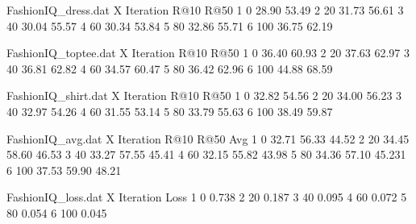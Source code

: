 \documentclass[10pt,lineno]{wlpeerj}
\begin{document}
\begin{filecontents}{FashionIQ_dress.dat}
X Iteration     R@10        R@50                
1 0	            28.90       53.49                 
2 20            31.73       56.61               	
3 40		    30.04       55.57     
4 60            30.34       53.84     	    
5 80            32.86       55.71     	    
6 100           36.75       62.19     	    
\end{filecontents}
\begin{filecontents}{FashionIQ_toptee.dat}
X Iteration     R@10        R@50                
1 0	            36.40       60.93                 
2 20            37.63       62.97               	
3 40		    36.81       62.82     
4 60            34.57       60.47     	    
5 80            36.42       62.96     	    
6 100           44.88       68.59     	    
\end{filecontents}
\begin{filecontents}{FashionIQ_shirt.dat}
X Iteration     R@10        R@50                
1 0	            32.82       54.56                 
2 20            34.00       56.23               	
3 40		    32.97       54.26     
4 60            31.55       53.14     	    
5 80            33.79       55.63     	    
6 100           38.49       59.87     	    
\end{filecontents}
\begin{filecontents}{FashionIQ_avg.dat}
X Iteration     R@10    R@50    Avg                     
1 0	            32.71   56.33   44.52                       
2 20            34.45   58.60   46.53                   	
3 40		    33.27   57.55   45.41        
4 60            32.15   55.82   43.98        	    
5 80            34.36   57.10   45.231        	    
6 100           37.53   59.90   48.21        	    
\end{filecontents}

\begin{filecontents}{FashionIQ_loss.dat}
X Iteration    Loss           
1 0	          0.738       
2 20          0.187      
3 40		  0.095       
4 60          0.072      
5 80          0.054       
6 100         0.045       
\end{filecontents}
\end{document}

